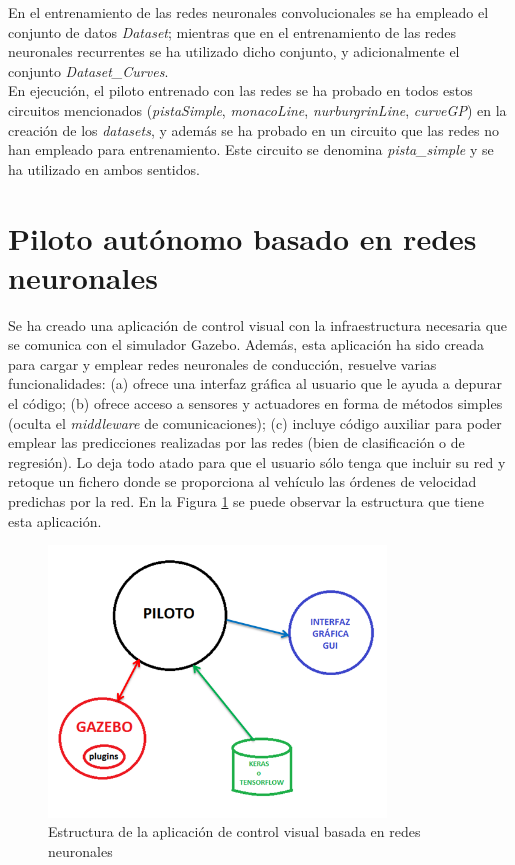 En el entrenamiento de las redes neuronales convolucionales se ha empleado el conjunto de datos \textit{Dataset}; mientras que en el entrenamiento de las redes neuronales recurrentes se ha utilizado dicho conjunto, y adicionalmente el conjunto \textit{Dataset\_Curves}.\\

En ejecución, el piloto entrenado con las redes se ha probado en todos estos circuitos mencionados (\textit{pistaSimple}, \textit{monacoLine}, \textit{nurburgrinLine}, \textit{curveGP}) en la creación de los \textit{datasets}, y además se ha probado en un circuito que las redes no han empleado para entrenamiento. Este circuito se denomina \textit{pista\_simple} y se ha utilizado en ambos sentidos.


\section{Piloto autónomo basado en redes neuronales}

Se ha creado una aplicación de control visual con la infraestructura necesaria que se comunica con el simulador Gazebo. Además, esta aplicación ha sido creada para cargar y emplear redes neuronales de conducción, resuelve varias funcionalidades: (a) ofrece una interfaz gráfica al usuario que le ayuda a depurar el código; (b) ofrece acceso a sensores y actuadores en forma de métodos simples (oculta el \textit{middleware} de comunicaciones); (c) incluye código auxiliar para poder emplear las predicciones realizadas por las redes (bien de clasificación o de regresión). Lo deja todo atado para que el usuario sólo tenga que incluir su red y retoque un fichero donde se proporciona al vehículo las órdenes de velocidad predichas por la red. En la Figura \ref{fig.nodo_piloto} se puede observar la estructura que tiene esta aplicación.\\

\begin{figure}
  \begin{center}
    \includegraphics[width=0.8\textwidth]{figures/Infraestructura/nodo_piloto.png}
		\caption{Estructura de la aplicación de control visual basada en redes neuronales}
		\label{fig.nodo_piloto}
		\end{center}
\end{figure}

